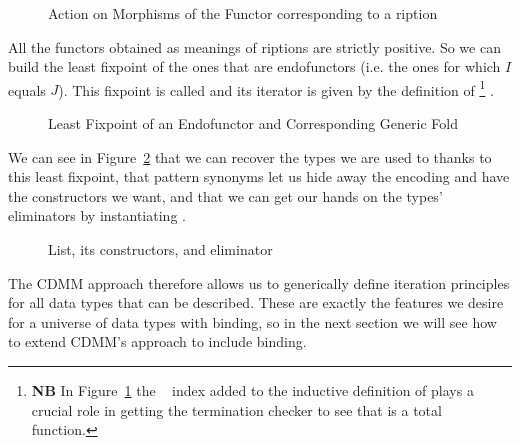 \begin{figure}[h]
\caption{Action on Morphisms of the Functor corresponding to a ription}
\end{figure}

All the functors obtained as meanings of riptions are strictly
positive. So we can build the least fixpoint of the ones that are endofunctors
(i.e. the ones for which $I$ equals $J$). This fixpoint is called 
and its iterator is given by the definition of  %
\footnote{\textbf{NB}
In Figure~\ref{figure:datamu} the ~\cite{DBLP:journals/corr/abs-1012-4896} index added
to the inductive definition of  plays a crucial role in getting the
termination checker to see that  is a total function.
}
.

\begin{figure}[h]
\caption{Least Fixpoint of an Endofunctor and Corresponding Generic Fold}\label{figure:datamu}
\end{figure}

We can see in Figure~\ref{fig:list} that we can recover the types we are
used to thanks to this least fixpoint, that pattern synonyms let us hide
away the encoding and have the constructors we want, and that we can get
our hands on the types' eliminators by instantiating .

\begin{figure}[h]
\begin{minipage}{0.45\textwidth}
\end{minipage}
\begin{minipage}{0.45\textwidth}
\end{minipage}
\caption{List, its constructors, and eliminator\label{fig:list}}
\end{figure}

The CDMM approach therefore allows us to generically define iteration principles
for all data types that can be described. These are exactly the features we desire
for a universe of data types with binding, so in the next section we will see how
to extend CDMM's approach to include binding.

